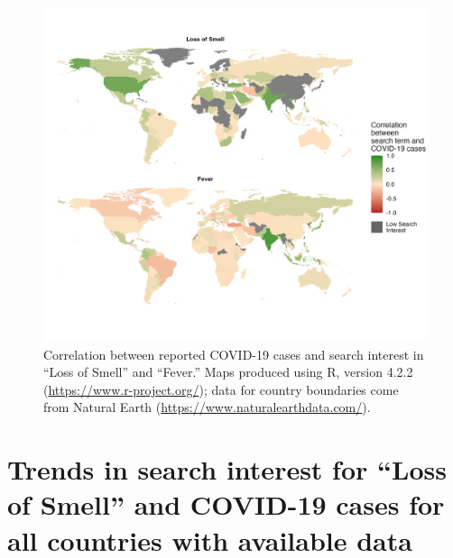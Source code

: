 \documentclass{article}
\begin{document}
\begin{figure}[H]
    \includegraphics[width=1\textwidth]{figures/cor_map.png} %
    \caption{Correlation between reported COVID-19 cases and search interest in ``Loss of Smell'' and ``Fever.'' Maps produced using R, version 4.2.2 (\url{https://www.r-project.org/}); data for country boundaries come from Natural Earth (\url{https://www.naturalearthdata.com/}).}
    \label{fig:cor_world_map}
\end{figure}

\newpage
\section{Trends in search interest for ``Loss of Smell'' and COVID-19 cases for all countries with available data}
\label{si:lossofsmell_covid_allcountries}
\end{document}
